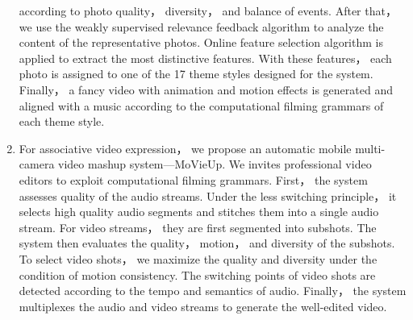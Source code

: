 \begin{enabstract}
\begin{enumerate}[{(1)}]
            according to photo quality， diversity， and balance of events. After
            that， we use the weakly supervised relevance feedback algorithm to
            analyze the content of the representative photos. Online feature
            selection algorithm is applied to extract the most distinctive features.
            With these features， each photo is assigned to one of the 17 theme
            styles designed for the system. Finally， a fancy video with
            animation and motion effects is generated and aligned with a music
            according to the computational filming grammars of each theme style.
        \item For associative video expression， we propose an automatic mobile
            multi-camera video mashup system---MoVieUp. We invites
            professional video editors to exploit computational filming
            grammars. First， the system assesses quality of the audio streams.
            Under the less switching principle， it selects high quality audio
            segments and stitches them into a single audio stream. For video
            streams， they are first segmented into subshots. The system then
            evaluates the quality， motion， and diversity of the subshots.
            To select video shots， we maximize the quality and diversity under
            the condition of motion consistency. The switching points of
            video shots are detected according to the tempo and semantics of
            audio. Finally， the system multiplexes the audio and video streams to
            generate the well-edited video.
    \end{enumerate}

\end{enabstract}
